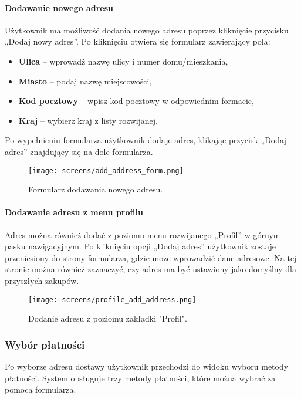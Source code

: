 \documentclass[12pt,a4paper,oneside]{article}
\theoremstyle{definition}
\numberwithin{equation}{section}
\begin{document}
\paragraph{Dodawanie nowego adresu}
Użytkownik ma możliwość dodania nowego adresu poprzez kliknięcie przycisku „Dodaj nowy adres”. Po kliknięciu otwiera się formularz zawierający pola:
\begin{itemize}
    \item \textbf{Ulica} – wprowadź nazwę ulicy i numer domu/mieszkania,
    \item \textbf{Miasto} – podaj nazwę miejscowości,
    \item \textbf{Kod pocztowy} – wpisz kod pocztowy w odpowiednim formacie,
    \item \textbf{Kraj} – wybierz kraj z listy rozwijanej.
\end{itemize}
Po wypełnieniu formularza użytkownik dodaje adres, klikając przycisk „Dodaj adres” znajdujący się na dole formularza.
\begin{figure}[H]
    \centering
    \texttt{[image: screens/add\_address\_form.png]}
    \caption{Formularz dodawania nowego adresu.}
    \label{fig:add_address_form}
\end{figure}
\paragraph{Dodawanie adresu z menu profilu}
Adres można również dodać z poziomu menu rozwijanego „Profil” w górnym pasku nawigacyjnym. Po kliknięciu opcji „Dodaj adres” użytkownik zostaje przeniesiony do strony formularza, gdzie może wprowadzić dane adresowe. Na tej stronie można również zaznaczyć, czy adres ma być ustawiony jako domyślny dla przyszłych zakupów.
\begin{figure}[H]
    \centering
    \texttt{[image: screens/profile\_add\_address.png]}
    \caption{Dodanie adresu z poziomu zakładki "Profil".}
    \label{fig:profile_add_address}
\end{figure}





\subsubsection{Wybór płatności}
Po wyborze adresu dostawy użytkownik przechodzi do widoku wyboru metody płatności. System obsługuje trzy metody płatności, które można wybrać za pomocą formularza.
\end{document}
